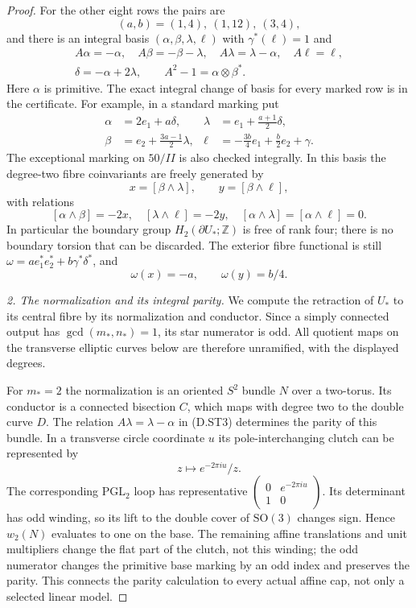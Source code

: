 \begin{proof}
For the other eight rows the pairs are
\[
 (a,b)=(1,4),\ (1,12),\ (3,4),                             \tag{D.ST2}
\]
and there is an integral basis $(\alpha,\beta,\lambda,\ell)$
with $\gamma^*(\ell)=1$ and
\[
\begin{gathered}
 A\alpha=-\alpha,\quad A\beta=-\beta-\lambda,\quad
 A\lambda=\lambda-\alpha,\quad A\ell=\ell,\\
 \delta=-\alpha+2\lambda,\qquad
 A^2-1=\alpha\otimes\beta^*.
\end{gathered}                                               \tag{D.ST3}
\]
Here $\alpha$ is primitive. The exact integral change of basis
for every marked row is in the certificate. For example, in a
standard marking put
\[
\begin{aligned}
 \alpha&=2e_1+a\delta,&
 \lambda&=e_1+\tfrac{a+1}{2}\delta,\\
 \beta&=e_2+\tfrac{3a-1}{2}\lambda,&
 \ell&=-\tfrac{3b}{4}e_1+\tfrac b2e_2+\gamma.
\end{aligned}
\]
The exceptional marking on $50/II$ is also checked integrally.
In this basis the degree-two fibre coinvariants are freely
generated by
\[
 x=[\beta\wedge\lambda],\qquad y=[\beta\wedge\ell],
\]
with relations
\[
 [\alpha\wedge\beta]=-2x,\quad
 [\lambda\wedge\ell]=-2y,\quad
 [\alpha\wedge\lambda]=[\alpha\wedge\ell]=0.                \tag{D.ST4}
\]
In particular the boundary group $H_2(\partial U_*;\mathbb Z)$
is free of rank four; there is no boundary torsion that can be
discarded. The exterior fibre functional is still
$\omega=a e_1^*e_2^*+b\gamma^*\delta^*$, and
\[
 \omega(x)=-a,\qquad \omega(y)=b/4.                         \tag{D.ST5}
\]

\emph{2. The normalization and its integral parity.}
We compute the retraction of $U_*$ to its central fibre by its
normalization and conductor. Since a simply connected output
has $\gcd(m_*,n_*)=1$, its star numerator is odd. All quotient
maps on the transverse elliptic curves below are therefore
unramified, with the displayed degrees.

For $m_*=2$ the normalization is an oriented $S^2$ bundle $N$
over a two-torus. Its conductor is a connected bisection $C$,
which maps with degree two to the double curve $D$. The relation
$A\lambda=\lambda-\alpha$ in (D.ST3) determines the parity of
this bundle. In a transverse circle coordinate $u$ its
pole-interchanging clutch can be represented by
\[
 z\longmapsto e^{-2\pi i u}/z.
\]
The corresponding $\mathrm{PGL}_2$ loop has representative
$\left(\begin{smallmatrix}0&e^{-2\pi i u}\\1&0\end{smallmatrix}\right)$.
Its determinant has odd winding, so its lift to the double cover
of $\mathrm{SO}(3)$ changes sign. Hence $w_2(N)$ evaluates to one
on the base. The remaining affine translations and unit
multipliers change the flat part of the clutch, not this winding;
the odd numerator changes the primitive base marking by an odd
index and preserves the parity. This connects the parity
calculation to every actual affine cap, not only a selected
linear model.


\end{proof}
